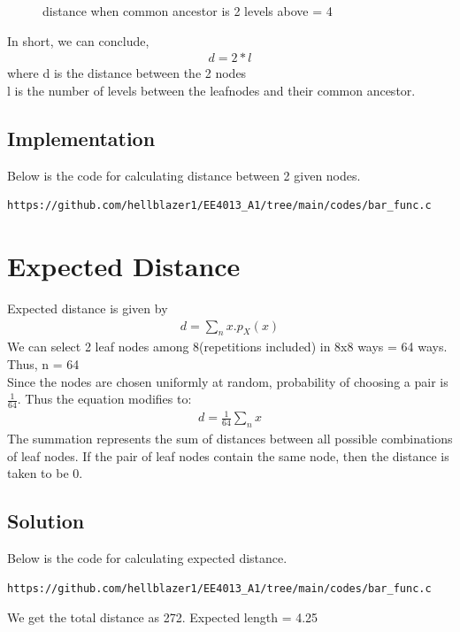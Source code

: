 \documentclass[journal,12pt,twocolumn]{IEEEtran}
\begin{document}
\begin{itemize}
\begin{figure}[!h]
        \caption{distance when common ancestor is 2 levels above = 4}
        \label{fig:2}
        \end{figure}
\end{itemize}

In short, we can conclude,
\begin{align}
    d = 2 * l
\end{align}
where d is the distance between the 2 nodes
\\
l is the number of levels between the leafnodes and their common ancestor.
\subsection{Implementation}
Below is the code for calculating distance between 2 given nodes.
\begin{lstlisting}
https://github.com/hellblazer1/EE4013_A1/tree/main/codes/bar_func.c
\end{lstlisting}
\section{Expected Distance}
Expected distance is given by
\begin{align}
    d = \sum_{n} x.p_X(x)
\end{align}
We can select 2 leaf nodes among 8(repetitions included) in 8x8 ways = 64 ways. Thus, n = 64
\\
Since the nodes are chosen uniformly at random, probability of choosing a pair is $ \frac{1}{64}$. Thus the equation modifies to:
\begin{align}
    d = \frac{1}{64} \sum_{n} x
\end{align}
The summation represents the sum of distances between all possible combinations of leaf nodes. If the pair of leaf nodes contain the same node, then the distance is taken to be 0.

\subsection{Solution}
Below is the code for calculating expected distance.
\begin{lstlisting}
https://github.com/hellblazer1/EE4013_A1/tree/main/codes/bar_func.c
\end{lstlisting}

We get the total distance as 272. Expected length = 4.25
\end{document}
